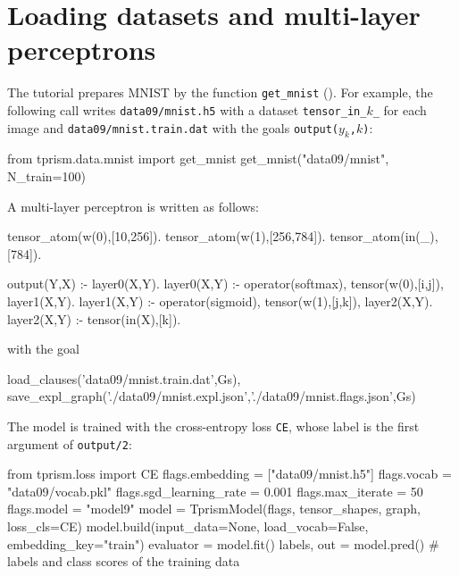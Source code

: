 \documentclass[a4paper]{report}
\begin{document}
\section{Loading datasets and multi-layer perceptrons}
\label{sec:tutorial_mlp}

The tutorial prepares MNIST by the function {\tt get\_mnist}
().  For example, the following call writes
{\tt data09/mnist.h5} with a dataset {\tt tensor\_in\_$k$\_} for each
image and {\tt data09/mnist.train.dat} with the goals {\tt output($y_k$,$k$)}:
\begin{pythoncode}
from tprism.data.mnist import get_mnist
get_mnist("data09/mnist", N_train=100)
\end{pythoncode}
  A multi-layer perceptron is written as follows:
\begin{prologcode}
tensor_atom(w(0),[10,256]).   %
tensor_atom(w(1),[256,784]).  %
tensor_atom(in(_),[784]).     %

output(Y,X) :- layer0(X,Y).
layer0(X,Y) :- operator(softmax), tensor(w(0),[i,j]), layer1(X,Y).
layer1(X,Y) :- operator(sigmoid), tensor(w(1),[j,k]), layer2(X,Y).
layer2(X,Y) :- tensor(in(X),[k]).
\end{prologcode}
with the goal
\begin{prologcode}
load_clauses('data09/mnist.train.dat',Gs),
save_expl_graph('./data09/mnist.expl.json','./data09/mnist.flags.json',Gs)
\end{prologcode}
The model is trained with the cross-entropy loss {\tt CE}, whose label
is the first argument of {\tt output/2}:
\begin{pythoncode}
from tprism.loss import CE
flags.embedding = ["data09/mnist.h5"]
flags.vocab = "data09/vocab.pkl"
flags.sgd_learning_rate = 0.001
flags.max_iterate = 50
flags.model = "model9"
model = TprismModel(flags, tensor_shapes, graph, loss_cls=CE)
model.build(input_data=None, load_vocab=False, embedding_key="train")
evaluator = model.fit()
labels, out = model.pred()     # labels and class scores of the training data
\end{pythoncode}
\end{document}
